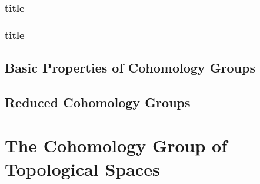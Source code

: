 \documentclass[Total.tex]{subfiles}
\begin{document}
					\subsubsection{title}
					\subsubsection{title}
				\subsection{Basic Properties of Cohomology Groups}
				\subsection{Reduced Cohomology Groups}
				
			\section{The Cohomology Group of Topological Spaces}
\end{document}

